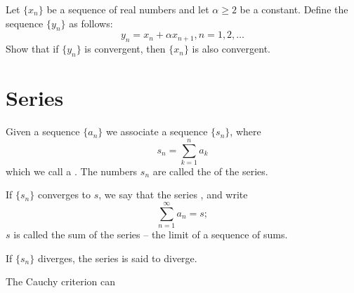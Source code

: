 \begin{prbm}
Let $\{x_n\}$ be a sequence of real numbers and let $\alpha\ge2$ be a constant. Define the sequence $\{y_n\}$ as follows:
\[ y_n=x_n+\alpha x_{n+1}, n=1,2,\dots \]
Show that if $\{y_n\}$ is convergent, then $\{x_n\}$ is also convergent.
\end{prbm}
\pagebreak

\section{Series}
\begin{definition}
Given a sequence $\{a_n\}$ we associate a sequence $\{s_n\}$, where
\[ s_n=\sum_{k=1}^na_k \]
which we call a . The numbers $s_n$ are called the  of the series.

If $\{s_n\}$ converges to $s$, we say that the series , and write
\[ \sum_{n=1}^\infty a_n=s; \]
$s$ is called the sum of the series -- the limit of a sequence of sums.

If $\{s_n\}$ diverges, the series is said to diverge.
\end{definition}

The Cauchy criterion can 

\begin{proposition}

\end{proposition}